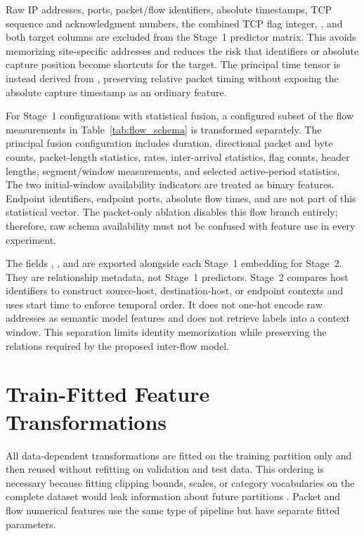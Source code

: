 \documentclass[11pt,fleqn]{report}
\begin{document}
Raw IP addresses, ports, packet/flow identifiers, absolute timestamps, TCP
sequence and acknowledgment numbers, the combined TCP flag integer,
, and both target columns are excluded from the Stage~1
predictor matrix. This avoids memorizing site-specific addresses and reduces
the risk that identifiers or absolute capture position become shortcuts for
the target. The principal time tensor is instead derived from
, preserving relative packet timing without exposing
the absolute capture timestamp as an ordinary feature.

For Stage~1 configurations with statistical fusion, a configured subset of the
flow measurements in Table~\ref{tab:flow_schema} is transformed separately.
The principal fusion configuration includes duration, directional packet and
byte counts, packet-length statistics, rates, inter-arrival statistics, flag
counts, header lengths, segment/window measurements, and selected active-period
statistics. The two initial-window availability indicators are treated as
binary features. Endpoint identifiers, endpoint ports, absolute flow times,
and  are not part of this statistical vector. The
packet-only ablation disables this flow branch entirely; therefore, raw schema
availability must not be confused with feature use in every experiment.

The fields , ,
and  are exported alongside each Stage~1
embedding for Stage~2. They are relationship metadata, not Stage~1 predictors.
Stage~2 compares host identifiers to construct source-host,
destination-host, or endpoint contexts and uses start time to enforce temporal
order. It does not one-hot encode raw addresses as semantic model features and
does not retrieve labels into a context window. This separation limits
identity memorization while preserving the relations required by the proposed
inter-flow model.

\section{Train-Fitted Feature Transformations}
\label{subsec:feature_transformations}

All data-dependent transformations are fitted on the training partition only
and then reused without refitting on validation and test data. This ordering is
necessary because fitting clipping bounds, scales, or category vocabularies on
the complete dataset would leak information about future partitions
\cite{Arp2022DosDonts}. Packet and flow numerical features use the same type of
pipeline but have separate fitted parameters.
\end{document}
